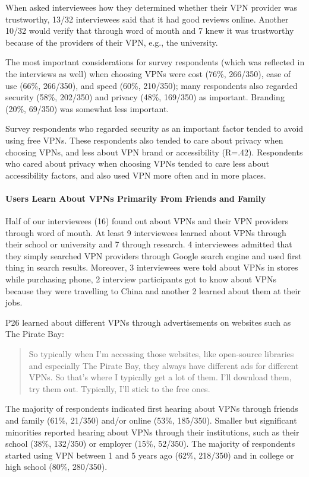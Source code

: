 When asked interviewees how they determined whether
their VPN provider was trustworthy, 13/32 interviewees said that it had
good reviews online. Another 10/32 would verify that through word of mouth and 7
knew it was trustworthy because of the providers of their VPN, e.g., the
university. 

The most important considerations for survey respondents (which was reflected in the interviews as well) when choosing VPNs
were cost (76\%, 266/350), ease of use (66\%, 266/350), and speed (60\%,
210/350); many respondents also regarded security (58\%, 202/350) and privacy
(48\%, 169/350) as important. Branding (20\%, 69/350) was somewhat less
important.

Survey respondents who regarded security as an important factor tended to avoid using
free VPNs. These respondents also tended to care about privacy when choosing
VPNs, and less about VPN brand or accessibility (R=.42). Respondents who cared
about privacy when choosing VPNs tended to care less about accessibility
factors, and also used VPN more often and in more places. 



\paragraph{Users Learn About VPNs Primarily From Friends and Family} Half of our interviewees (16) found out about
VPNs and their VPN providers through word of mouth. At
least 9 interviewees learned about VPNs through their school or university and
7 through research. 4 interviewees admitted that they simply searched VPN
providers through Google search engine and used first thing in
search results. Moreover, 3 interviewees were told about VPNs in stores while
purchasing phone, 2 interview participants got to know about VPNs because they
were travelling to China and another 2 learned about them at their jobs.


P26 learned about different VPNs through advertisements on websites such as
The Pirate Bay: \begin{quote}So typically when I'm accessing those websites,
    like open-source libraries and especially The Pirate Bay, they always have
    different ads for different VPNs. So that's where I typically get a lot of
    them. I'll download them, try them out. Typically, I'll stick to the free
    ones.\end{quote}

The majority of respondents indicated first hearing about VPNs through friends
and family (61\%, 21/350) and/or online (53\%, 185/350). Smaller but
significant minorities reported hearing about VPNs through their institutions,
such as their school (38\%, 132/350) or employer (15\%, 52/350). The majority
of respondents started using VPN between 1 and 5 years ago (62\%, 218/350) and
in college or high school (80\%, 280/350).

